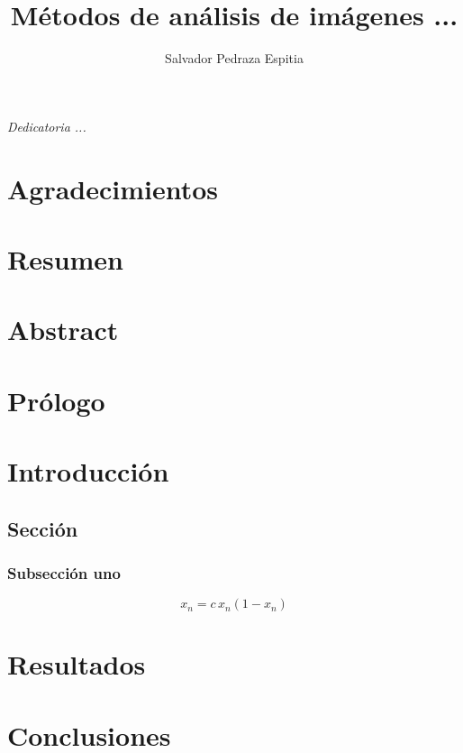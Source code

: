 \documentclass[letterpaper,12pt,oneside]{book}
\author{Salvador Pedraza Espitia}
\title{M\'etodos de an\'alisis de im\'agenes ...}
\begin{document}
\frontmatter
\maketitle
\chapter*{}
\begin{flushright}%
  \emph{Dedicatoria ...}
  \thispagestyle{empty}
\end{flushright}

\chapter{Agradecimientos}

\chapter{Resumen}

\chapter{Abstract}


\tableofcontents
\listoffigures

\chapter{Prólogo}
    
\mainmatter

\chapter{Introducci\'on} %


\section{Secci\'on}
    
    \subsection{Subsecci\'on uno}
    \begin{equation}
    	x_n = c \, x_n(1 - x_n)
    	\label{Ec:logis}
    \end{equation}

\chapter{Resultados}  %

\chapter{Conclusiones}  %

%
%

\backmatter%
\end{document}
